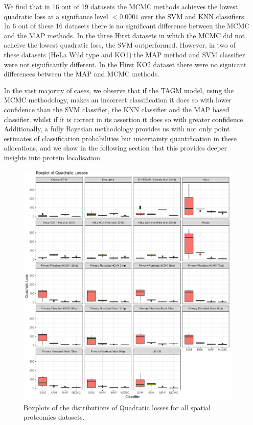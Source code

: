 \documentclass[12pt,english]{article}\usepackage[]{graphicx}\usepackage[]{color}
\makeatletter
\def\maxwidth{ %
  \ifdim\Gin@nat@width>\linewidth
    \linewidth
  \else
    \Gin@nat@width
  \fi
}
\newenvironment{knitrout}{}{} %
\makeatother
\begin{document}
We find that in 16 out of 19 datasets {\color{black}{(all of those except HeLa Wild type,
HeLa KO1 and HeLa KO2)}} the MCMC methods achieves the
lowest quadratic loss at a signifiance level $<0.0001$ over the SVM
and KNN classifiers. In 6 out of these 16 datasets there is no
significant difference between the MCMC and the MAP methods. In the
three Hirst datasets in which the MCMC did not acheive the lowest
quadratic loss, the SVM outperformed. However, in two of these
datasets (HeLa Wild type and KO1) the MAP method and SVM classifier were
not significantly different. In the Hirst KO2 dataset there were no
signicant differences between the MAP and MCMC methods.

In the vast majority of cases, we observe that if the TAGM model,
using the MCMC methodology, makes an incorrect classification it does
so with lower confidence than the SVM classifier, the KNN classifier
and the MAP based classifier, whilst if it is correct in its assertion
it does so with greater confidence. Additionally, a fully Bayesian
methodology provides us with not only point estimates of
classification probabilities but uncertainty quantification in these
allocations, and we show in the following section that this provides
deeper insights into protein localisation.



\begin{figure}[ht]
  \centering
\begin{knitrout}
\color{fgcolor}
\includegraphics[width=\maxwidth]{figure/quadboxplots-1} 

\end{knitrout}
\caption{Boxplots of the distributions of Quadratic losses for all
  spatial proteomics datasets.}
  \label{figure::quadloss}
\end{figure}
\end{document}
